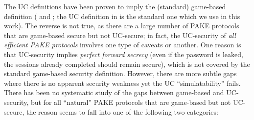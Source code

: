 The UC definitions have been proven to imply the (standard) game-based definition (\cite[Appendix~A]{EC:CHKLM05} and \cite[Section~5]{C:ABBJKX20}; the UC definition in \cite{EC:CHKLM05} is the standard one which we use in this work). The reverse is not true, as there are a large number of PAKE protocols that are game-based secure but not UC-secure; in fact, the UC-security of \emph{all efficient PAKE protocols} involves one type of caveats or another. One reason is that UC-security implies \emph{perfect forward secrecy} (even if the password is leaked, the sessions already completed should remain secure), which is not covered by the standard game-based security definition. However, there are more subtle gaps where there is no apparent security weakness yet the UC ``simulatability'' fails. There has been no systematic study of the gaps between game-based and UC-security, but for all ``natural'' PAKE protocols that are game-based but not UC-secure, the reason seems to fall into one of the following two categories:
